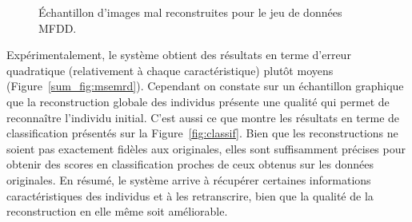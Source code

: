 \begin{figure}[h]
    \caption{Échantillon d'images mal reconstruites pour le jeu de données MFDD.}
\label{sum_fig:num_reconstructed_bad}
\end{figure}



Expérimentalement, le système obtient des résultats en terme d'erreur quadratique (relativement à chaque caractéristique) plutôt moyens (Figure~\ref{sum_fig:msemrd}). Cependant on constate sur un échantillon graphique que la reconstruction globale des individus présente une qualité qui permet de reconnaître l'individu initial. C'est aussi ce que montre les résultats en terme de classification présentés sur la Figure~\ref{fig:classif}. Bien que les reconstructions ne soient pas exactement fidèles aux originales, elles sont suffisamment précises pour obtenir des scores en classification proches de ceux obtenus sur les données originales. En résumé, le système arrive à récupérer certaines informations caractéristiques des individus et à les retranscrire, bien que la qualité de la reconstruction en elle même soit améliorable.

